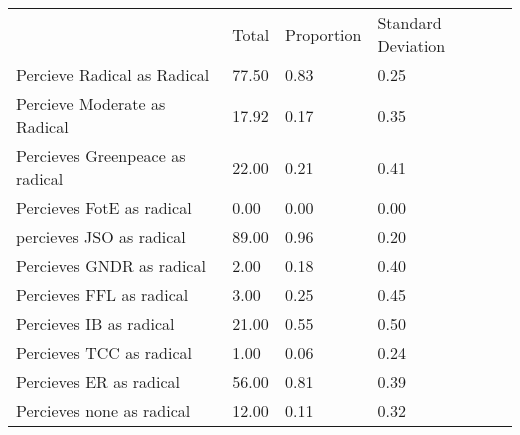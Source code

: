 \documentclass{article}
\begin{document}
\begin{table}[!h]
\centering
\begin{tabular}{llll}
\cline{1-4}
\multicolumn{1}{|l}{} &
  \multicolumn{1}{|l}{Total} &
  \multicolumn{1}{|l}{Proportion} &
  \multicolumn{1}{|l|}{Standard Deviation} \\
\cline{1-4}
\multicolumn{1}{|l}{Percieve Radical as Radical} &
  \multicolumn{1}{|l}{77.50} &
  \multicolumn{1}{|l}{0.83} &
  \multicolumn{1}{|l|}{0.25} \\
\cline{1-4}
\multicolumn{1}{|l}{Percieve Moderate as Radical} &
  \multicolumn{1}{|l}{17.92} &
  \multicolumn{1}{|l}{0.17} &
  \multicolumn{1}{|l|}{0.35} \\
\cline{1-4}
\multicolumn{1}{|l}{Percieves Greenpeace as radical} &
  \multicolumn{1}{|l}{22.00} &
  \multicolumn{1}{|l}{0.21} &
  \multicolumn{1}{|l|}{0.41} \\
\cline{1-4}
\multicolumn{1}{|l}{Percieves FotE as radical} &
  \multicolumn{1}{|l}{0.00} &
  \multicolumn{1}{|l}{0.00} &
  \multicolumn{1}{|l|}{0.00} \\
\cline{1-4}
\multicolumn{1}{|l}{percieves JSO as radical} &
  \multicolumn{1}{|l}{89.00} &
  \multicolumn{1}{|l}{0.96} &
  \multicolumn{1}{|l|}{0.20} \\
\cline{1-4}
\multicolumn{1}{|l}{Percieves GNDR as radical} &
  \multicolumn{1}{|l}{2.00} &
  \multicolumn{1}{|l}{0.18} &
  \multicolumn{1}{|l|}{0.40} \\
\cline{1-4}
\multicolumn{1}{|l}{Percieves FFL as radical} &
  \multicolumn{1}{|l}{3.00} &
  \multicolumn{1}{|l}{0.25} &
  \multicolumn{1}{|l|}{0.45} \\
\cline{1-4}
\multicolumn{1}{|l}{Percieves IB as radical} &
  \multicolumn{1}{|l}{21.00} &
  \multicolumn{1}{|l}{0.55} &
  \multicolumn{1}{|l|}{0.50} \\
\cline{1-4}
\multicolumn{1}{|l}{Percieves TCC as radical} &
  \multicolumn{1}{|l}{1.00} &
  \multicolumn{1}{|l}{0.06} &
  \multicolumn{1}{|l|}{0.24} \\
\cline{1-4}
\multicolumn{1}{|l}{Percieves ER as radical} &
  \multicolumn{1}{|l}{56.00} &
  \multicolumn{1}{|l}{0.81} &
  \multicolumn{1}{|l|}{0.39} \\
\cline{1-4}
\multicolumn{1}{|l}{Percieves none as radical} &
  \multicolumn{1}{|l}{12.00} &
  \multicolumn{1}{|l}{0.11} &
  \multicolumn{1}{|l|}{0.32} \\
\cline{1-4}
\end{tabular}
\end{table}
\end{document}
